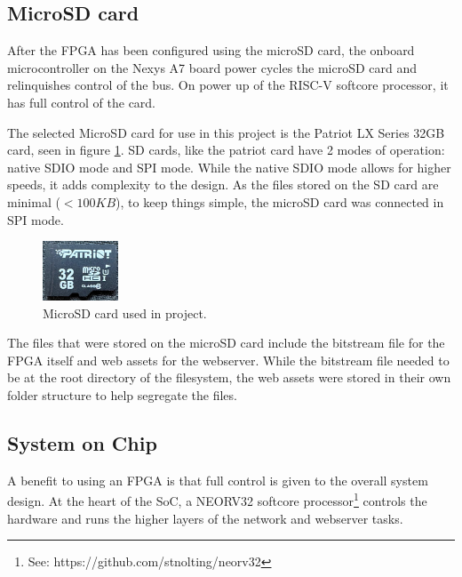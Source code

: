 \subsection{MicroSD card}

After the FPGA has been configured using the microSD card, the onboard microcontroller on the Nexys A7 board power cycles the microSD card and relinquishes control of the bus. On power up of the RISC-V softcore processor, it has full control of the card. 

The selected MicroSD card for use in this project is the Patriot LX Series 32GB card, seen in figure \ref{fig:microsd_card}. SD cards, like the patriot card have 2 modes of operation: native SDIO mode and SPI mode. While the native SDIO mode allows for higher speeds, it adds complexity to the design. As the files stored on the SD card are minimal ($< 100KB$), to keep things simple, the microSD card was connected in SPI mode.

\begin{figure}[h]
    \centering
    \includegraphics[width=0.2\textwidth]{Images/microsdcard.jpeg}
    \caption[MicroSD card used in project]{MicroSD card used in project.}
    \label{fig:microsd_card}
\end{figure}


The files that were stored on the microSD card include the bitstream file for the FPGA itself and web assets for the webserver. While the bitstream file needed to be at the root directory of the filesystem, the web assets were stored in their own folder structure to help segregate the files.  








 
\subsection{System on Chip}

A benefit to using an FPGA is that full control is given to the overall system design. At the heart of the SoC, a NEORV32 softcore processor\footnote[1]{See: https://github.com/stnolting/neorv32} controls the hardware and runs the higher layers of the network and webserver tasks.

